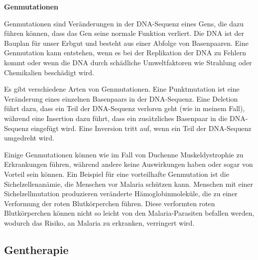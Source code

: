 \documentclass[fontsize=14pt,a4paper,headinclude,DIV=calc,automark]{scrbook}
\begin{document}
\begin{mdframed}[
    linewidth=0.3pt,         %
    linecolor=rahmenlinie,   %
    leftmargin=0, rightmargin=0,
    innertopmargin=12pt, innerbottommargin=12pt,
    innerleftmargin=12pt, innerrightmargin=12pt,
    backgroundcolor=white
]
\small\sffamily
\setlength{\parindent}{0pt} %

\textbf{Genmutationen}

\vspace{0.5\baselineskip}

Genmutationen sind Veränderungen in der DNA-Sequenz eines Gens, die dazu führen können, dass das Gen seine normale Funktion verliert. Die DNA ist der Bauplan für unser Erbgut und besteht aus einer Abfolge von Basenpaaren. Eine Genmutation kann entstehen, wenn es bei der Replikation der DNA zu Fehlern kommt oder wenn die DNA durch schädliche Umweltfaktoren wie Strahlung oder Chemikalien beschädigt wird.

\vspace{0.5\baselineskip}

Es gibt verschiedene Arten von Genmutationen. Eine Punktmutation ist eine Veränderung eines einzelnen Basenpaars in der DNA-Sequenz. Eine Deletion führt dazu, dass ein Teil der DNA-Sequenz verloren geht (wie in meinem Fall), während eine Insertion dazu führt, dass ein zusätzliches Basenpaar in die DNA-Sequenz eingefügt wird. Eine Inversion tritt auf, wenn ein Teil der DNA-Sequenz umgedreht wird.

\vspace{0.5\baselineskip}

Einige Genmutationen können wie im Fall von Duchenne Muskeldystrophie zu Erkrankungen führen, während andere keine Auswirkungen haben oder sogar von Vorteil sein können. Ein Beispiel für eine vorteilhafte Genmutation ist die Sichelzellenanämie, die Menschen vor Malaria schützen kann. Menschen mit einer Sichelzellmutation produzieren veränderte Hämoglobinmoleküle, die zu einer Verformung der roten Blutkörperchen führen. Diese verformten roten Blutkörperchen können nicht so leicht von den Malaria-Parasiten befallen werden, wodurch das Risiko, an Malaria zu erkranken, verringert wird.

\end{mdframed}


\subsection{Gentherapie}
\end{document}
